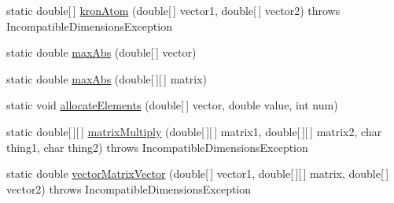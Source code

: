 \begin{DoxyCompactItemize}
static double\mbox{[}$\,$\mbox{]} \hyperlink{classOMP2D_1_1MatrixOperations_aee29169db5db03e194c041f89399b35c}{kron\-Atom} (double\mbox{[}$\,$\mbox{]} vector1, double\mbox{[}$\,$\mbox{]} vector2)  throws Incompatible\-Dimensions\-Exception 
\item 
static double \hyperlink{classOMP2D_1_1MatrixOperations_a20c8df75f73908438dd418cb803d077e}{max\-Abs} (double\mbox{[}$\,$\mbox{]} vector)
\item 
static double \hyperlink{classOMP2D_1_1MatrixOperations_a3326a590f1c188296d0e14cd6f5476ad}{max\-Abs} (double\mbox{[}$\,$\mbox{]}\mbox{[}$\,$\mbox{]} matrix)
\item 
static void \hyperlink{classOMP2D_1_1MatrixOperations_a9dfd3ba69faf8f5c905a5c9dcac30cdd}{allocate\-Elements} (double\mbox{[}$\,$\mbox{]} vector, double value, int num)
\item 
static double\mbox{[}$\,$\mbox{]}\mbox{[}$\,$\mbox{]} \hyperlink{classOMP2D_1_1MatrixOperations_a66a0e1bf820558880db67d2efac229cb}{matrix\-Multiply} (double\mbox{[}$\,$\mbox{]}\mbox{[}$\,$\mbox{]} matrix1, double\mbox{[}$\,$\mbox{]}\mbox{[}$\,$\mbox{]} matrix2, char thing1, char thing2)  throws Incompatible\-Dimensions\-Exception 
\item 
static double \hyperlink{classOMP2D_1_1MatrixOperations_aa2f4938d53dcbb632fbf2e499705f29f}{vector\-Matrix\-Vector} (double\mbox{[}$\,$\mbox{]} vector1, double\mbox{[}$\,$\mbox{]}\mbox{[}$\,$\mbox{]} matrix, double\mbox{[}$\,$\mbox{]} vector2)  throws Incompatible\-Dimensions\-Exception 
\end{DoxyCompactItemize}


